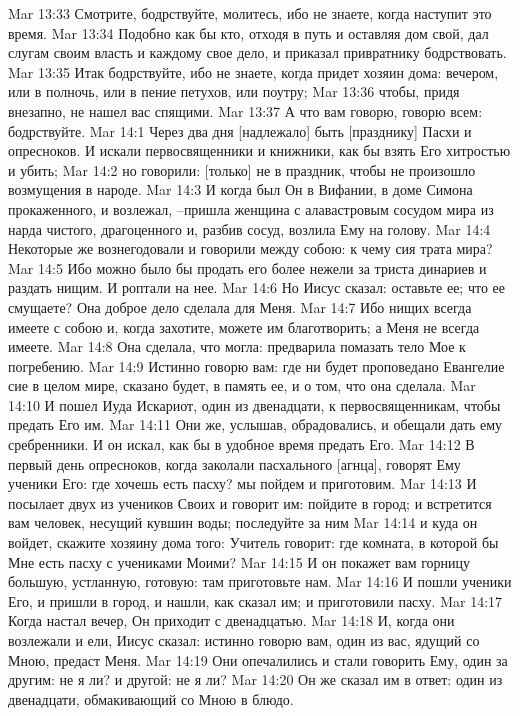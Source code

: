 Mar 13:33  Смотрите, бодрствуйте, молитесь, ибо не знаете, когда наступит это время.
Mar 13:34  Подобно как бы кто, отходя в путь и оставляя дом свой, дал слугам своим власть и каждому свое дело, и приказал привратнику бодрствовать.
Mar 13:35  Итак бодрствуйте, ибо не знаете, когда придет хозяин дома: вечером, или в полночь, или в пение петухов, или поутру;
Mar 13:36  чтобы, придя внезапно, не нашел вас спящими.
Mar 13:37  А что вам говорю, говорю всем: бодрствуйте.
Mar 14:1  Через два дня [надлежало] быть [празднику] Пасхи и опресноков. И искали первосвященники и книжники, как бы взять Его хитростью и убить;
Mar 14:2  но говорили: [только] не в праздник, чтобы не произошло возмущения в народе.
Mar 14:3  И когда был Он в Вифании, в доме Симона прокаженного, и возлежал, --пришла женщина с алавастровым сосудом мира из нарда чистого, драгоценного и, разбив сосуд, возлила Ему на голову.
Mar 14:4  Некоторые же вознегодовали и говорили между собою: к чему сия трата мира?
Mar 14:5  Ибо можно было бы продать его более нежели за триста динариев и раздать нищим. И роптали на нее.
Mar 14:6  Но Иисус сказал: оставьте ее; что ее смущаете? Она доброе дело сделала для Меня.
Mar 14:7  Ибо нищих всегда имеете с собою и, когда захотите, можете им благотворить; а Меня не всегда имеете.
Mar 14:8  Она сделала, что могла: предварила помазать тело Мое к погребению.
Mar 14:9  Истинно говорю вам: где ни будет проповедано Евангелие сие в целом мире, сказано будет, в память ее, и о том, что она сделала.
Mar 14:10  И пошел Иуда Искариот, один из двенадцати, к первосвященникам, чтобы предать Его им.
Mar 14:11  Они же, услышав, обрадовались, и обещали дать ему сребренники. И он искал, как бы в удобное время предать Его.
Mar 14:12  В первый день опресноков, когда заколали пасхального [агнца], говорят Ему ученики Его: где хочешь есть пасху? мы пойдем и приготовим.
Mar 14:13  И посылает двух из учеников Своих и говорит им: пойдите в город; и встретится вам человек, несущий кувшин воды; последуйте за ним
Mar 14:14  и куда он войдет, скажите хозяину дома того: Учитель говорит: где комната, в которой бы Мне есть пасху с учениками Моими?
Mar 14:15  И он покажет вам горницу большую, устланную, готовую: там приготовьте нам.
Mar 14:16  И пошли ученики Его, и пришли в город, и нашли, как сказал им; и приготовили пасху.
Mar 14:17  Когда настал вечер, Он приходит с двенадцатью.
Mar 14:18  И, когда они возлежали и ели, Иисус сказал: истинно говорю вам, один из вас, ядущий со Мною, предаст Меня.
Mar 14:19  Они опечалились и стали говорить Ему, один за другим: не я ли? и другой: не я ли?
Mar 14:20  Он же сказал им в ответ: один из двенадцати, обмакивающий со Мною в блюдо.
